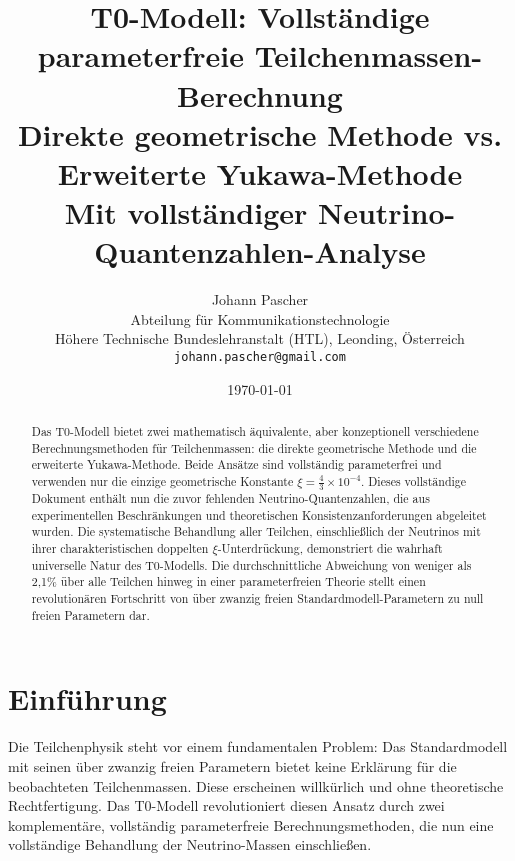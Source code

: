 \documentclass[12pt,a4paper]{article}
\newcommand{\xipar}{\xi}
\begin{document}
	
	\title{T0-Modell: Vollständige parameterfreie Teilchenmassen-Berechnung \\
		\large Direkte geometrische Methode vs. Erweiterte Yukawa-Methode \\
		\large Mit vollständiger Neutrino-Quantenzahlen-Analyse}
	\author{Johann Pascher\\
		Abteilung für Kommunikationstechnologie\\
		Höhere Technische Bundeslehranstalt (HTL), Leonding, Österreich\\
		\texttt{johann.pascher@gmail.com}}
	\date{\today}
	
	\maketitle
	
	\begin{abstract}
		Das T0-Modell bietet zwei mathematisch äquivalente, aber konzeptionell verschiedene Berechnungsmethoden für Teilchenmassen: die direkte geometrische Methode und die erweiterte Yukawa-Methode. Beide Ansätze sind vollständig parameterfrei und verwenden nur die einzige geometrische Konstante $\xipar = \frac{4}{3} \times 10^{-4}$. Dieses vollständige Dokument enthält nun die zuvor fehlenden Neutrino-Quantenzahlen, die aus experimentellen Beschränkungen und theoretischen Konsistenzanforderungen abgeleitet wurden. Die systematische Behandlung aller Teilchen, einschließlich der Neutrinos mit ihrer charakteristischen doppelten $\xi$-Unterdrückung, demonstriert die wahrhaft universelle Natur des T0-Modells. Die durchschnittliche Abweichung von weniger als 2,1\% über alle Teilchen hinweg in einer parameterfreien Theorie stellt einen revolutionären Fortschritt von über zwanzig freien Standardmodell-Parametern zu null freien Parametern dar.
	\end{abstract}
	
	\tableofcontents
	\newpage
	
	\section{Einführung}
	\label{sec:introduction}
	
	Die Teilchenphysik steht vor einem fundamentalen Problem: Das Standardmodell mit seinen über zwanzig freien Parametern bietet keine Erklärung für die beobachteten Teilchenmassen. Diese erscheinen willkürlich und ohne theoretische Rechtfertigung. Das T0-Modell revolutioniert diesen Ansatz durch zwei komplementäre, vollständig parameterfreie Berechnungsmethoden, die nun eine vollständige Behandlung der Neutrino-Massen einschließen.
	
\end{document}
